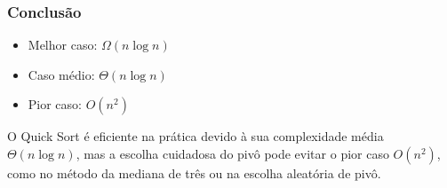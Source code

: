 \subsubsection{Conclusão}
\begin{itemize}
  \item Melhor caso: \(\Omega(n \log n)\)
  \item Caso médio: \(\Theta(n \log n)\)
  \item Pior caso: \(O(n^2)\)
\end{itemize}

O Quick Sort é eficiente na prática devido à sua complexidade média \(\Theta(n \log n)\), mas a escolha cuidadosa do pivô pode evitar o pior caso \(O(n^2)\), como no método da mediana de três ou na escolha aleatória de pivô.
